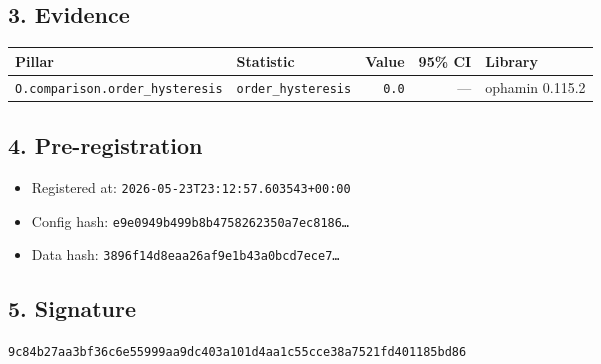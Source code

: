 \documentclass{article}
\begin{document}
\subsection*{3. Evidence}
\begin{tabular}{llrrl}\toprule
\textbf{Pillar} & \textbf{Statistic} & \textbf{Value} & \textbf{95\% CI} & \textbf{Library} \\\midrule
\texttt{O.comparison.order\_hysteresis} & \texttt{order\_hysteresis} & \texttt{0.0} & --- & ophamin 0.115.2 \\
\bottomrule\end{tabular}
\subsection*{4. Pre-registration}
\begin{itemize}
\item Registered at: \texttt{2026-05-23T23:12:57.603543+00:00}
\item Config hash: \texttt{e9e0949b499b8b4758262350a7ec8186\dots}
\item Data hash: \texttt{3896f14d8eaa26af9e1b43a0bcd7ece7\dots}
\end{itemize}
\subsection*{5. Signature}
\texttt{9c84b27aa3bf36c6e55999aa9dc403a101d4aa1c55cce38a7521fd401185bd86}\\
\end{document}
